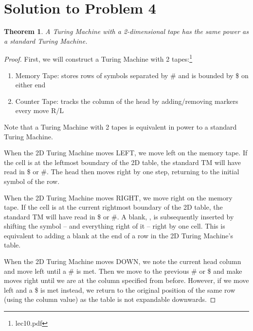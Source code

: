 \documentclass[11pt]{report}
\newcounter{problem}
\theoremstyle{definition}
\theoremstyle{plain}
\theoremstyle{plain}
\newtheorem{theorem}{Theorem}[problem]
\begin{document}
\pagebreak

\section*{Solution to Problem 4}

\begin{theorem}
A Turing Machine with a 2-dimensional tape has the same power as a standard Turing Machine.
\end{theorem}

\begin{proof}
First, we will construct a Turing Machine with 2 tapes:\footnote{lec10.pdf}

\begin{enumerate}
\item Memory Tape: stores rows of symbols separated by \# and is bounded by \$ on either end
\item Counter Tape: tracks the column of the head by adding/removing markers every move R/L
\end{enumerate} 

\noindent Note that a Turing Machine with 2 tapes is equivalent in power to a standard Turing Machine. \newline

\noindent When the 2D Turing Machine moves LEFT, we move left on the memory tape. 
If the cell is at the leftmost boundary of the 2D table, 
the standard TM will have read in \$ or \#. The head then moves right by one step, 
returning to the initial symbol of the row. \newline

\noindent When the 2D Turing Machine moves RIGHT, we move right on the memory tape.
If the cell is at the current rightmost boundary of the 2D table,
the standard TM will have read in \$ or \#. 
A blank, \textvisiblespace, is subsequently inserted by 
shifting the symbol -- and everything right of it -- right by one cell.
This is equivalent to adding a blank at the end of a row in the 2D Turing Machine's table. \newline

\noindent When the 2D Turing Machine moves DOWN, we note the current head column and move left until a \# is met. 
Then we move to the previous \# or \$ and make moves right until we are at the column specified from before.
However, if we move left and a \$ is met instead, we return to the original position of the same row
(using the column value) as the table is not expandable downwards. \newline


\end{proof}
\end{document}
